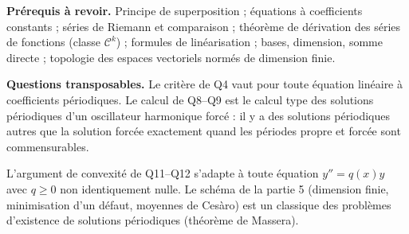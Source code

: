 \documentclass[11pt,a4paper]{article}
\begin{document}
\textbf{Prérequis à revoir.} Principe de superposition ; équations à coefficients constants ; séries de Riemann et comparaison ; théorème de dérivation des séries de fonctions (classe \(\mathcal C^k\)) ; formules de linéarisation ; bases, dimension, somme directe ; topologie des espaces vectoriels normés de dimension finie.

\textbf{Questions transposables.} Le critère de Q4 vaut pour toute équation linéaire à coefficients périodiques. Le calcul de Q8--Q9 est le calcul type des solutions périodiques d'un oscillateur harmonique forcé : il y a des solutions périodiques autres que la solution forcée exactement quand les périodes propre et forcée sont commensurables.

L'argument de convexité de Q11--Q12 s'adapte à toute équation \(y''=q(x)y\) avec \(q\ge0\) non identiquement nulle. Le schéma de la partie 5 (dimension finie, minimisation d'un défaut, moyennes de Cesàro) est un classique des problèmes d'existence de solutions périodiques (théorème de Massera).
\end{document}
